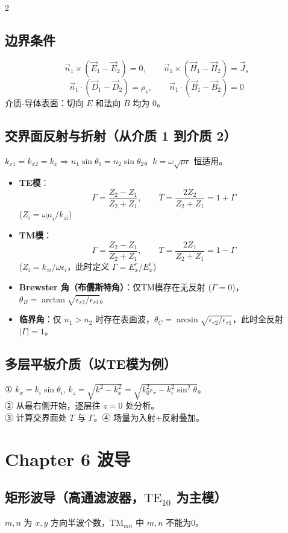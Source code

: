 \documentclass[10pt,a4paper,landscape]{article}
\begin{document}
\begin{multicols}{2}
\subsection{边界条件}
\[
\vec{n}_1 \times (\vec{E}_1 - \vec{E}_2) = 0, \qquad \vec{n}_1 \times (\vec{H}_1 - \vec{H}_2) = \vec{J}_s
\]
\[
\vec{n}_1 \cdot (\vec{D}_1 - \vec{D}_2) = \rho_s, \qquad \vec{n}_1 \cdot (\vec{B}_1 - \vec{B}_2) = 0
\]
介质-导体表面：切向 $E$ 和法向 $B$ 均为 0。

\subsection{交界面反射与折射（从介质 1 到介质 2）}
$k_{x1} = k_{x2} = k_x \Rightarrow n_1 \sin\theta_1 = n_2 \sin\theta_2$。$k = \omega\sqrt{\mu\epsilon}$ 恒适用。
\begin{itemize}
    \item \textbf{TE模}：
    \[
    \Gamma = \frac{Z_2 - Z_1}{Z_2 + Z_1}, \qquad T = \frac{2Z_2}{Z_2 + Z_1} = 1 + \Gamma
    \]
    ($Z_i = \omega\mu_i / k_{zi}$)
    \item \textbf{TM模}：
    \[
    \Gamma = \frac{Z_2 - Z_1}{Z_2 + Z_1}, \qquad T = \frac{2Z_1}{Z_2 + Z_1} = 1 - \Gamma
    \]
    ($Z_i = k_{zi} / \omega\epsilon_i$，此时定义 $\Gamma = E_x^r/E_x^i$)
    \item \textbf{Brewster 角（布儒斯特角）}：仅TM模存在无反射 ($\Gamma=0$)，$\theta_B = \arctan\sqrt{\epsilon_{r2}/\epsilon_{r1}}$。
    \item \textbf{临界角}：仅 $n_1 > n_2$ 时存在表面波，$\theta_C = \arcsin\sqrt{\epsilon_{r2}/\epsilon_{r1}}$，此时全反射 $|\Gamma|=1$。
\end{itemize}

\subsection{多层平板介质（以TE模为例）}
① $k_x = k_i \sin\theta_i$, $k_z = \sqrt{k^2 - k_x^2} = \sqrt{k_0^2\epsilon_r - k_i^2\sin^2\theta}$。\\
② 从最右侧开始，逐层往 $z=0$ 处分析。\\
③ 计算交界面处 $T$ 与 $\Gamma$。④ 场量为入射+反射叠加。

\section{Chapter 6 波导}
\subsection{矩形波导（高通滤波器，$\text{TE}_{10}$ 为主模）}
$m,n$ 为 $x,y$ 方向半波个数，$\text{TM}_{mn}$ 中 $m,n$ 不能为0。


\end{multicols}
\end{document}
